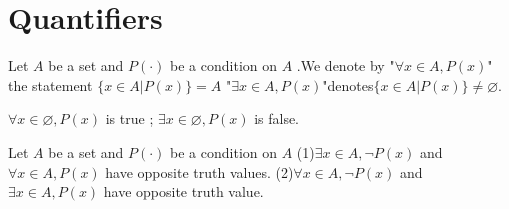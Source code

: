 \documentclass{book}
\numberwithin{equation}{section}
\begin{document}
\section{Quantifiers}
\begin{definitionenv}
    Let $A$ be a set and $P(\cdot)$ be a condition on $A$ .We denote by 
    \newline
    "$\forall x\in A, P(x)$" the statement $\{x\in A|P(x)\}=A$
    \newline
    "$\exists x\in A,P(x)$"denotes$\{x\in A|P(x)\}\not= \varnothing$.
\end{definitionenv}
\begin{exampleenv}
    $\forall x\in \varnothing ,P(x)$ is true ; $\exists x\in \varnothing,P(x)$ is false.
\end{exampleenv}
\begin{theoremenv}\label{theorem2.4.1}
    Let $A$ be a set and $P(\cdot)$ be a condition on $A$
    \newline
    (1)$\exists x\in A,\neg P(x) $ and $ \forall x\in A,P(x)$ have opposite truth values.
    \newline
    (2)$\forall x\in A,\neg P(x)$ and $\exists x\in A,P(x)$ have opposite truth value.
\end{theoremenv}
\end{document}
